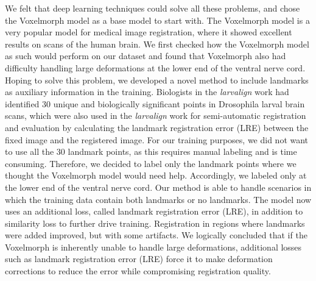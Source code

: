 \documentclass{book}
\begin{document}
	
	We felt that deep learning techniques could solve all these problems, and chose the Voxelmorph model as a base model to start with. The Voxelmorph model is a very popular model for medical image registration, where it showed excellent results on scans of the human brain. We first checked how the Voxelmorph model as such would perform on our dataset and found that Voxelmorph also had difficulty handling large deformations at the lower end of the ventral nerve cord. Hoping to solve this problem, we developed a novel method to include landmarks as auxiliary information in the training. Biologists in the \textit{larvalign} work had identified 30 unique and biologically significant points in Drosophila larval brain scans, which were also used in the \textit{larvalign} work for semi-automatic registration and evaluation by calculating the landmark registration error (LRE) between the fixed image and the registered image. For our training purposes, we did not want to use all the 30 landmark points, as this requires manual labeling and is time consuming. Therefore, we decided to label only the landmark points where we thought the Voxelmorph model would need help. Accordingly, we labeled only at the lower end of the ventral nerve cord. Our method is able to handle scenarios in which the training data contain both landmarks or no landmarks. The model now uses an additional loss, called landmark registration error (LRE), in addition to similarity loss to further drive training. Registration in regions where landmarks were added improved, but with some artifacts. We logically concluded that if the Voxelmorph is inherently unable to handle large deformations, additional losses such as landmark registration error (LRE) force it to make deformation corrections to reduce the error while compromising registration quality.
	
\end{document}
